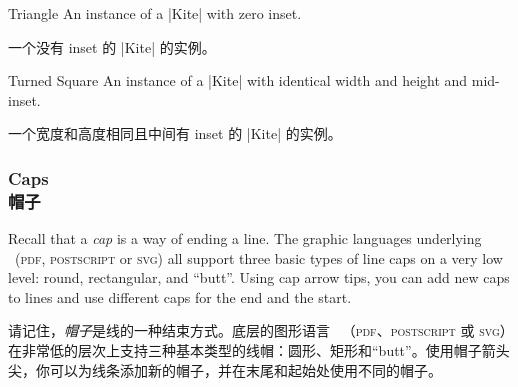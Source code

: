\begin{arrowtipsimple}{Triangle}
    An instance of a |Kite| with zero inset.

    一个没有 inset 的 |Kite| 的实例。

    \begin{arrowexamples}
        \arrowexample[]
        \arrowexampledup[sep]
        \arrowexampledupdot[sep]
        \arrowexample[open]
        \arrowexample[length=4pt]
        \arrowexample[angle=45:1pt 3]
        \arrowexample[angle=60:1pt 3]
        \arrowexample[angle=90:1pt 3]
        \arrowexample[round]
        \arrowexample[slant=.3]
        \arrowexample[left]
        \arrowexample[right]
        \arrowexample[red]
    \end{arrowexamples}
\end{arrowtipsimple}

\begin{arrowtipsimple}{Turned Square}
    An instance of a |Kite| with identical width and height and mid-inset.
    
    一个宽度和高度相同且中间有 inset 的 |Kite| 的实例。
%
    \begin{arrowexamples}
        \arrowexample[]
        \arrowexampledup[sep]
        \arrowexampledupdot[sep]
        \arrowexample[open]
        \arrowexample[length=4pt]
        \arrowexample[round]
        \arrowexample[slant=.3]
        \arrowexample[left]
        \arrowexample[right]
        \arrowexample[red]
    \end{arrowexamples}
\end{arrowtipsimple}


\subsubsection{Caps\\帽子}

Recall that a \emph{cap} is a way of ending a line. The graphic languages
underlying \tikzname\ (\textsc{pdf}, \textsc{postscript} or \textsc{svg}) all
support three basic types of line caps on a very low level: round, rectangular,
and ``butt''. Using cap arrow tips, you can add new caps to lines and use
different caps for the end and the start.

请记住，\emph{帽子}是线的一种结束方式。底层的图形语言 \tikzname\ （\textsc{pdf}、\textsc{postscript} 或 \textsc{svg}）在非常低的层次上支持三种基本类型的线帽：圆形、矩形和“butt”。使用帽子箭头尖，你可以为线条添加新的帽子，并在末尾和起始处使用不同的帽子。


